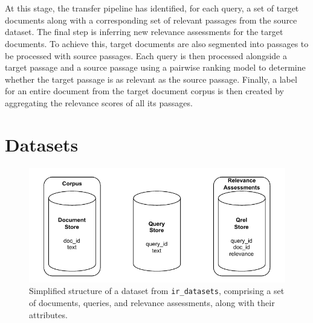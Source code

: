 \\\\
At this stage, the transfer pipeline has identified, for each query, a set of target documents along with a corresponding set of relevant passages from the source dataset. The final step is inferring new relevance assessments for the target documents. To achieve this, target documents are also segmented into passages to be processed with source passages. Each query is then processed alongside a target passage and a source passage using a pairwise ranking model to determine whether the target passage is as relevant as the source passage. Finally, a label for an entire document from the target document corpus is then created by aggregating the relevance scores of all its passages.

\section{Datasets}\label{datasets}

\begin{figure}[t]
    \centering
    \includegraphics[width=\textwidth]{./graphics/drawio/datasets.pdf}
    \caption{Simplified structure of a dataset from \texttt{ir\_datasets}, comprising a set of documents, queries, and relevance assessments, along with their attributes.}
    \label{fig:retrieval-task}
\end{figure}

